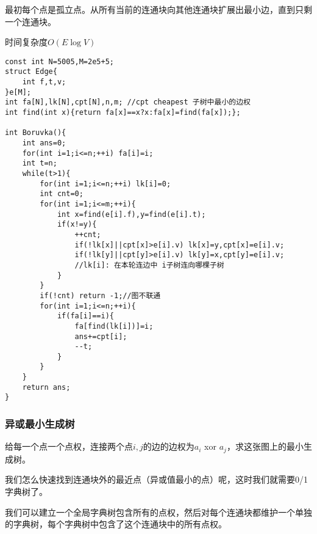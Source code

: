 \documentclass[UTF8]{ctexart}
\begin{document}
最初每个点是孤立点。从所有当前的连通块向其他连通块扩展出最小边，直到只剩一个连通块。

时间复杂度$O(E\log V)$

\begin{lstlisting}
const int N=5005,M=2e5+5;
struct Edge{
    int f,t,v;
}e[M];
int fa[N],lk[N],cpt[N],n,m; //cpt cheapest 子树中最小的边权 
int find(int x){return fa[x]==x?x:fa[x]=find(fa[x]);};

int Boruvka(){
    int ans=0;
    for(int i=1;i<=n;++i) fa[i]=i;
    int t=n;
    while(t>1){
        for(int i=1;i<=n;++i) lk[i]=0;
        int cnt=0;
        for(int i=1;i<=m;++i){
            int x=find(e[i].f),y=find(e[i].t);
            if(x!=y){
                ++cnt;
                if(!lk[x]||cpt[x]>e[i].v) lk[x]=y,cpt[x]=e[i].v;
                if(!lk[y]||cpt[y]>e[i].v) lk[y]=x,cpt[y]=e[i].v;
                //lk[i]: 在本轮连边中 i子树连向哪棵子树 
            }
        }
        if(!cnt) return -1;//图不联通 
        for(int i=1;i<=n;++i){
            if(fa[i]==i){
                fa[find(lk[i])]=i;
                ans+=cpt[i];
                --t;
            }
        }
    }
    return ans;
} 
\end{lstlisting}

\subsubsection{异或最小生成树}

给每一个点一个点权，连接两个点$i,j$的边的边权为$a_i$ xor $a_j$，求这张图上的最小生成树。

我们怎么快速找到连通块外的最近点（异或值最小的点）呢，这时我们就需要0/1字典树了。

我们可以建立一个全局字典树包含所有的点权，然后对每个连通块都维护一个单独的字典树，每个字典树中包含了这个连通块中的所有点权。
\end{document}
